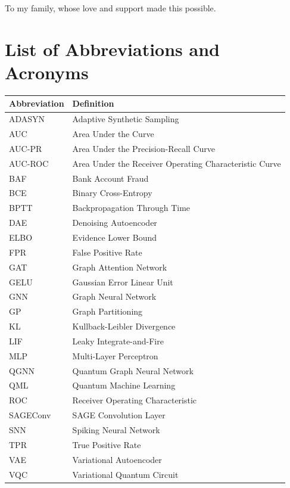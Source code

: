 To my family, whose love and support made this possible.

\tableofcontents
\newpage

\listoffigures
\newpage

\listoftables
\newpage

\listofalgorithms
\newpage

\chapter*{List of Abbreviations and Acronyms}

\begin{table}[H]
\centering
\small
\begin{tabularx}{0.7\textwidth}{lL}
\toprule
\textbf{Abbreviation} & \textbf{Definition} \\
\midrule
ADASYN & Adaptive Synthetic Sampling \\
AUC & Area Under the Curve \\
AUC-PR & Area Under the Precision-Recall Curve \\
AUC-ROC & Area Under the Receiver Operating Characteristic Curve \\
BAF & Bank Account Fraud \\
BCE & Binary Cross-Entropy \\
BPTT & Backpropagation Through Time \\
DAE & Denoising Autoencoder \\
ELBO & Evidence Lower Bound \\
FPR & False Positive Rate \\
GAT & Graph Attention Network \\
GELU & Gaussian Error Linear Unit \\
GNN & Graph Neural Network \\
GP & Graph Partitioning \\
KL & Kullback-Leibler Divergence \\
LIF & Leaky Integrate-and-Fire \\
MLP & Multi-Layer Perceptron \\
QGNN & Quantum Graph Neural Network \\
QML & Quantum Machine Learning \\
ROC & Receiver Operating Characteristic \\
SAGEConv & SAGE Convolution Layer \\
SNN & Spiking Neural Network \\
TPR & True Positive Rate \\
VAE & Variational Autoencoder \\
VQC & Variational Quantum Circuit \\
\bottomrule
\end{tabularx}
\end{table}

